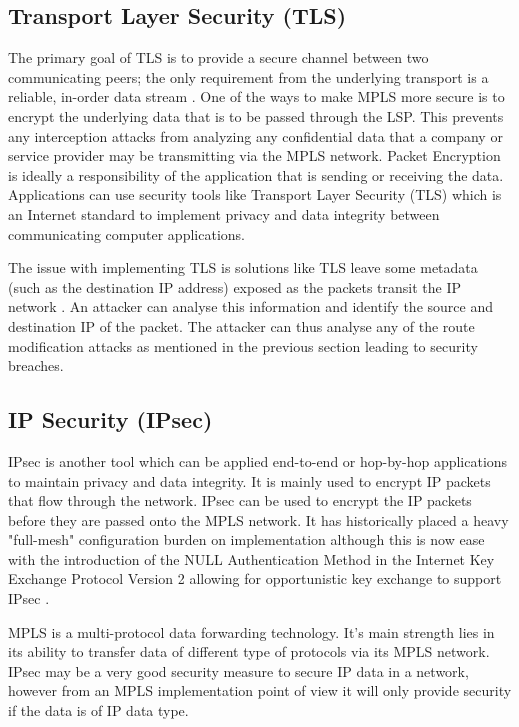 \subsection{Transport Layer Security (TLS)}
 The primary goal of TLS is to provide a secure channel between two
 communicating peers; the only requirement from the underlying
 transport is a reliable, in-order data stream \cite{rfc8446}. One of the ways to make MPLS more secure is to encrypt the underlying data that is to be passed through the LSP. This prevents any interception attacks from analyzing any confidential data that a company or service provider may be transmitting via the MPLS network. Packet Encryption is ideally a responsibility of the application that is sending or receiving the data. Applications can use security tools like Transport Layer Security (TLS) which is an Internet standard to implement privacy and data integrity between communicating computer applications.

The issue with implementing TLS is solutions like TLS leave some metadata (such as the destination IP address) exposed as the packets transit the IP network \cite{mpls-os-internet-draft}. An attacker can analyse this information and identify the source and destination IP of the packet. The attacker can thus analyse any of the route modification attacks as mentioned in the previous section leading to security breaches.

\subsection{IP Security (IPsec)}
IPsec is another tool which can be applied end-to-end or hop-by-hop applications to maintain privacy and data integrity. It is mainly used to encrypt IP packets that flow through the network. IPsec can be used to encrypt the IP packets before they are passed onto the MPLS network. It has historically placed a heavy "full-mesh" configuration burden on implementation although this is now ease with the introduction of the NULL Authentication Method in the Internet Key Exchange Protocol Version 2 allowing for opportunistic key exchange to support IPsec \cite{grayson2009analysis}.

MPLS is a multi-protocol data forwarding technology. It's main strength lies in its ability to transfer data of different type of protocols via its MPLS network. IPsec may be a very good security measure to secure IP data in a network, however from an MPLS implementation point of view it will only provide security if the data is of IP data type.

